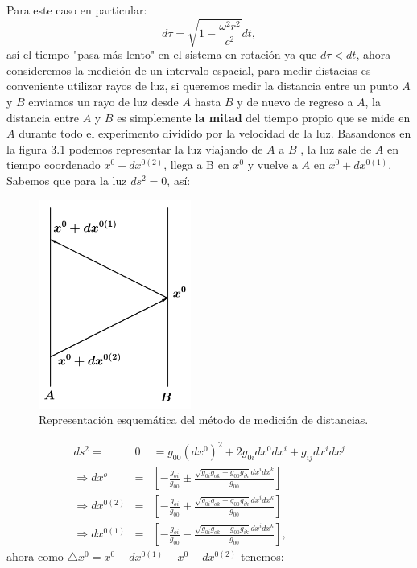Para este caso en particular:
\begin{equation}
d\tau=\sqrt{1-\frac{\omega^{2}r^{2}}{c^{2}}}dt,
\end{equation}
así el tiempo "pasa más lento" en el sistema en rotación ya que $d\tau<dt$, ahora consideremos la medición de un intervalo espacial, para medir distacias es conveniente utilizar rayos de luz, si queremos medir la distancia entre un punto $A$ y $B$ enviamos un rayo de luz desde $A$ hasta $B$ y de nuevo de regreso a $A$, la distancia entre $A$ y $B$ es simplemente \textbf{la mitad} del tiempo propio que se mide en $A$ durante todo el experimento dividido por la velocidad de la luz. Basandonos en la figura 3.1 podemos representar la luz viajando de $A$ a $B$ , la luz sale de $A$ en tiempo coordenado $x^{0}+dx^{0(2)}$, llega a B en $x^0$ y vuelve a $A$ en $x^{0}+dx^{0(1)}$. Sabemos que para la luz $ds^2=0$, así:
\begin{figure}[h!]
\centering
\includegraphics[width=5cm]{Imagenes/Fig17}
\caption[Medición de distancias en sistemas de coordenadas no inerciales.]{Representación esquemática del método de medición de distancias.}
\end{figure}
\begin{eqnarray}
\nonumber ds^{2}=&0&=g_{00}(dx^{0})^{2}+2g_{0i}dx^{0}dx^{i}+g_{ij}dx^{i}dx^{j}\\
\nonumber \Rightarrow dx^{o}&=&\left[-\frac{g_{oi}}{g_{00}}\pm\frac{\sqrt{g_{0i}g_{ok}+g_{00}g_{ik}}dx^{i}dx^{k}}{g_{00}}\right]\\
\Rightarrow dx^{0(2)}&=&\left[-\frac{g_{oi}}{g_{00}}+\frac{\sqrt{g_{0i}g_{ok}+g_{00}g_{ik}}dx^{i}dx^{k}}{g_{00}}\right]\\
\Rightarrow dx^{0(1)}&=&\left[-\frac{g_{oi}}{g_{00}}-\frac{\sqrt{g_{0i}g_{ok}+g_{00}g_{ik}}dx^{i}dx^{k}}{g_{00}}\right],
\end{eqnarray} 
ahora como $\triangle x^0=x^0+dx^{0(1)}-x^0-dx^{0(2)}$ tenemos:
